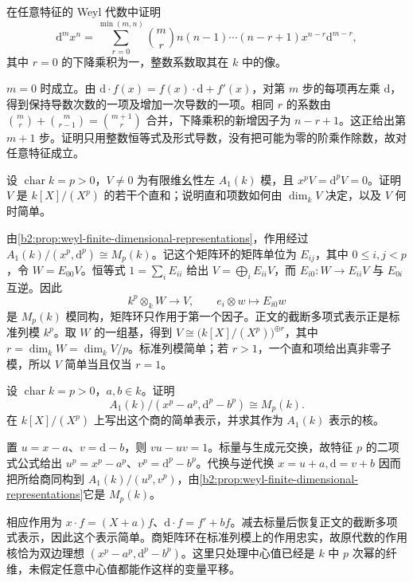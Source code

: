 \begin{optionalexercise}\label{b2:ex:20-weyl-normal-ordering}
	在任意特征的 Weyl 代数中证明
	\[
		\mathrm{d}^mx^n=\sum_{r=0}^{\min(m,n)}\binom mr n(n-1)\cdots(n-r+1)x^{n-r}\mathrm{d}^{m-r},
	\]
	其中 \(r=0\) 的下降乘积为一，整数系数取其在 \(k\) 中的像。
\end{optionalexercise}
\begin{solution}
	\(m=0\) 时成立。由 \(\mathrm{d}\cdot f(x)=f(x)\cdot\mathrm{d}+f'(x)\)，对第 \(m\) 步的每项再左乘 \(\mathrm{d}\)，得到保持导数次数的一项及增加一次导数的一项。相同 \(r\) 的系数由 \(\binom mr+\binom m{r-1}=\binom{m+1}r\) 合并，下降乘积的新增因子为 \(n-r+1\)。这正给出第 \(m+1\) 步。证明只用整数恒等式及形式导数，没有把可能为零的阶乘作除数，故对任意特征成立。
\end{solution}

\begin{optionalexercise}\label{b2:ex:20-weyl-finite-representations}
	设 \(\operatorname{char}k=p>0\)，\(V\ne0\) 为有限维幺性左 \(A_1(k)\) 模，且 \(x^pV=\mathrm d^pV=0\)。证明 \(V\) 是 \(k[X]/(X^p)\) 的若干个直和；说明直和项数如何由 \(\dim_kV\) 决定，以及 \(V\) 何时简单。
\end{optionalexercise}
\begin{solution}
	由\cref{b2:prop:weyl-finite-dimensional-representations}，作用经过 \(A_1(k)/(x^p,\mathrm d^p)\cong M_p(k)\)。记这个矩阵环的矩阵单位为 \(E_{ij}\)，其中 \(0\le i,j<p\)，令 \(W=E_{00}V\)。恒等式 \(1=\sum_iE_{ii}\) 给出 \(V=\bigoplus_iE_{ii}V\)，而 \(E_{i0}:W\to E_{ii}V\) 与 \(E_{0i}\) 互逆。因此
	\[
		k^p\otimes_kW\longrightarrow V,\qquad e_i\otimes w\longmapsto E_{i0}w
	\]
	是 \(M_p(k)\) 模同构，矩阵环只作用于第一个因子。正文的截断多项式表示正是标准列模 \(k^p\)。取 \(W\) 的一组基，得到 \(V\cong\bigl(k[X]/(X^p)\bigr)^{\oplus r}\)，其中 \(r=\dim_kW=\dim_kV/p\)。标准列模简单；若 \(r>1\)，一个直和项给出真非零子模，所以 \(V\) 简单当且仅当 \(r=1\)。
\end{solution}

\begin{optionalexercise}\label{b2:ex:20-weyl-characteristic-p-matrix}
	设 \(\operatorname{char}k=p>0\)，\(a,b\in k\)。证明
	\[
		A_1(k)/(x^p-a^p,\mathrm d^p-b^p)\cong M_p(k).
	\]
	在 \(k[X]/(X^p)\) 上写出这个商的简单表示，并求其作为 \(A_1(k)\) 表示的核。
\end{optionalexercise}
\begin{solution}
	置 \(u=x-a\)、\(v=\mathrm d-b\)，则 \(vu-uv=1\)。标量与生成元交换，故特征 \(p\) 的二项式公式给出 \(u^p=x^p-a^p\)、\(v^p=\mathrm d^p-b^p\)。代换与逆代换 \(x=u+a,\mathrm d=v+b\) 因而把所给商同构到 \(A_1(k)/(u^p,v^p)\)，由\cref{b2:prop:weyl-finite-dimensional-representations}它是 \(M_p(k)\)。

	相应作用为 \(x\cdot f=(X+a)f\)、\(\mathrm d\cdot f=f'+bf\)。减去标量后恢复正文的截断多项式表示，因此这个表示简单。商矩阵环在标准列模上的作用忠实，故原代数的作用核恰为双边理想 \((x^p-a^p,\mathrm d^p-b^p)\)。这里只处理中心值已经是 \(k\) 中 \(p\) 次幂的纤维，未假定任意中心值都能作这样的变量平移。
\end{solution}

